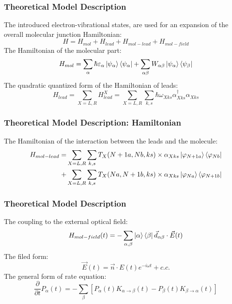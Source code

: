 \documentclass{beamer}
\begin{document}
\begin{frame}
\frametitle{Theoretical Model Description}
    The introduced electron-vibrational states, are used for an expansion of the overall molecular junction Hamiltonian:
\begin{equation}
    H = H_{mol} + H_{lead} + H_{mol-lead} + H_{mol-field}
\end{equation}
    The Hamiltonian of the molecular part:
\begin{equation}
    H_{mol} = \sum_{\alpha}\hbar\varepsilon_{\alpha}\ket{\psi_\alpha}\bra{\psi_\alpha}+\sum_{\alpha\beta}W_{\alpha\beta}\ket{\psi_\alpha}\bra{\psi_\beta}
\end{equation}
The quadratic quantized form of the Hamiltonian of leads:
\begin{equation}
    H_{lead} = \sum_{X=L,R}H_{lead}^X = \sum_{X=L,R}\sum_{k,s}\hbar\omega_{Xks}\alpha^\dagger_{Xks}\alpha_{Xks}
\end{equation}

\end{frame}

\begin{frame}
\frametitle{Theoretical Model Description: Hamiltonian}
The Hamiltonian of the interaction between the leads and the molecule:
\begin{equation}
\begin{split}
    H_{mol-lead}= & \sum_{X=L,R}\sum_{k,s}T_X(N+1a,Nb,ks)\times\alpha_{Xks}\ket{\varphi_{N+1a}}\bra{\varphi_{Nb}}  \\
    + & \sum_{X=L,R}\sum_{k,s}T_X(Na,N+1b,ks)\times\alpha_{Xks}\ket{\varphi_{Na}}\bra{\varphi_{N+1b}} 
\end{split}
\end{equation}
\end{frame}

\begin{frame}
\frametitle{Theoretical Model Description}
The coupling to the external optical field:
\begin{equation}
    H_{mol-field}(t)=-\sum_{\alpha,\beta}\ket{\alpha}\bra{\beta}\vec{d}_{\alpha\beta}\cdot\vec{E}(t)
\end{equation}
The filed form:
\begin{equation}
    \vec{E}(t) = \vec{n}\cdot E(t)e^{-i\omega t} + c.c.
\end{equation}
The general form of rate equation:
\begin{equation}
    \frac{\partial}{\partial t} P_{\alpha}(t) = -\sum_{\beta}\left[P_{\alpha}(t) K_{\alpha\rightarrow\beta}(t)-P_{\beta}(t) K_{\beta\rightarrow \alpha}(t)\right]
\end{equation}
\end{frame}
\end{document}
